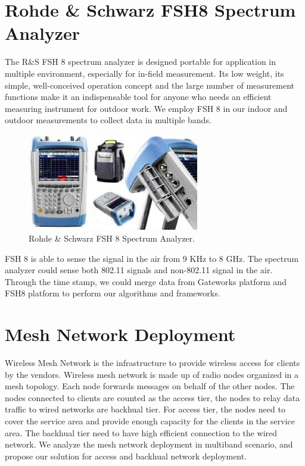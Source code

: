 \section{Rohde \& Schwarz FSH8 Spectrum Analyzer}

The R\&S FSH 8 spectrum analyzer is designed portable for application 
in multiple environment, especially for in-field measurement. Its low 
weight, its simple, well-conceived operation concept and the large number 
of measurement functions make it an indispensable tool for anyone who 
needs an efficient measuring instrument for outdoor work. We employ 
FSH 8 in our indoor and outdoor measurements to collect data in multiple
bands.

\begin{figure} 
\centering
\includegraphics[width=75mm]{figures/fsh8}
\vspace{-0.1in}
\caption{Rohde \& Schwarz FSH 8 Spectrum Analyzer.}
\label{fig:fsh8}
\vspace{0.1in}
\end{figure}

FSH 8 is able to sense the signal in the air from 9 KHz to 
8 GHz. The spectrum analyzer could sense both 802.11 signals 
and non-802.11 signal in the air. Through the time stamp, 
we could merge data from Gateworks platform and FSH8 platform 
to perform our algorithms and frameworks.

\section{Mesh Network Deployment}

Wireless Mesh Network is the infrastructure to provide 
wireless access for clients by the vendors. Wireless 
mesh network is made up of radio nodes organized in a mesh 
topology. Each node forwards messages on behalf of the 
other nodes. The nodes connected to clients are counted 
as the access tier, the nodes to relay data traffic to 
wired networks are backhual tier. For access tier, the 
nodes need to cover the service area and provide enough 
capacity for the clients in the service area. The backhual 
tier need to have high efficient connection to the wired 
network. We analyze the mesh network deployment in multiband 
scenario, and propose our solution for access and backhual 
network deployment.

